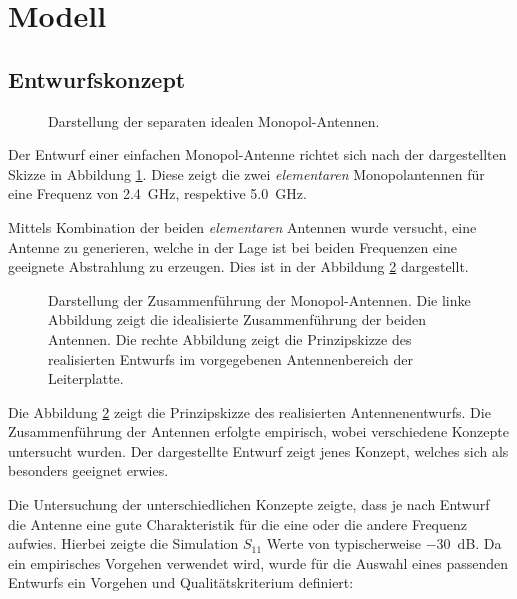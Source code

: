 \section{Modell}

\subsection{Entwurfskonzept}

\begin{figure}[h!]
	\centering
	\def\svgscale{0.75}
	
	\caption{Darstellung der separaten idealen Monopol-Antennen.}
	\label{fig:antenna_concept_1}
\end{figure}

Der Entwurf einer einfachen Monopol-Antenne richtet sich nach der dargestellten
Skizze in Abbildung \ref{fig:antenna_concept_1}. Diese zeigt die zwei
\emph{elementaren} Monopolantennen für eine Frequenz von \SI{2.4}{\giga\hertz},
respektive \SI{5.0}{\giga\hertz}. 
 

Mittels Kombination der beiden \emph{elementaren} Antennen wurde versucht, eine Antenne zu generieren, welche in der Lage ist bei beiden Frequenzen eine geeignete Abstrahlung zu erzeugen. Dies ist in der
Abbildung \ref{fig:antenna_concept_2} dargestellt. 

\begin{figure}[h!]
	\centering
	\def\svgscale{0.75}
	
	\caption[Darstellung der Zusammenführung der Monopol-Antennen.]{
		Darstellung der Zusammenführung der Monopol-Antennen.
		Die linke Abbildung zeigt die idealisierte Zusammenführung
		der beiden Antennen. Die rechte Abbildung zeigt die
		Prinzipskizze des realisierten Entwurfs im vorgegebenen
		Antennenbereich der Leiterplatte.}
	\label{fig:antenna_concept_2}
\end{figure}

Die Abbildung \ref{fig:antenna_concept_2} zeigt die Prinzipskizze des
realisierten Antennenentwurfs. Die Zusammenführung der Antennen erfolgte
empirisch, wobei verschiedene Konzepte untersucht wurden. Der dargestellte
Entwurf zeigt jenes Konzept, welches sich als besonders geeignet erwies.

Die Untersuchung der unterschiedlichen Konzepte zeigte, dass je nach
Entwurf die Antenne eine gute Charakteristik für die eine oder die andere
Frequenz aufwies. Hierbei zeigte die Simulation $S_{11}$ Werte von
typischerweise \SI{-30}{\dB}. Da ein empirisches Vorgehen verwendet
wird, wurde für die Auswahl eines passenden Entwurfs ein Vorgehen und
Qualitätskriterium definiert:


